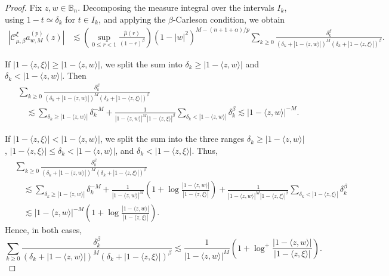\documentclass[preprint,12pt,times]{elsarticle}
\theoremstyle{definition}
\theoremstyle{remark}
\numberwithin{equation}{section}
\begin{document}
\begin{proof}
Fix \(z,w\in\mathbb B_n\). Decomposing the measure integral over the intervals
\(I_k\), using \(1-t\simeq\delta_k\) for \(t\in I_k\), and applying the
\(\beta\)-Carleson condition, we obtain
\[
\begin{aligned}
  |\mathcal C_{\mu,\beta}^{\xi}a_{w,M}^{(p)}(z)|
  &\lesssim
  \left(\sup_{0\le r<1}\frac{\widehat\mu(r)}{(1-r)^\beta}\right)
  (1-|w|^2)^{M-(n+1+\alpha)/p}
  \sum_{k\ge0}
  \frac{\delta_k^\beta}{(\delta_k+|1-\langle z,w\rangle|)^M
        (\delta_k+|1-\langle z,\xi\rangle|)^\beta}.
\end{aligned}
\]

\noindent If \(|1-\langle z,\xi\rangle|\ge |1-\langle z,w\rangle|\), we split the sum into
\(\delta_k\ge |1-\langle z,w\rangle|\) and \(\delta_k<|1-\langle z,w\rangle|\). Then
\[
\begin{aligned}
  &\sum_{k\ge0}
  \frac{\delta_k^\beta}{(\delta_k+|1-\langle z,w\rangle|)^M
        (\delta_k+|1-\langle z,\xi\rangle|)^\beta} \\
  &\quad\lesssim
  \sum_{\delta_k\ge |1-\langle z,w\rangle|}\delta_k^{-M}
  +\frac{1}{|1-\langle z,w\rangle|^M|1-\langle z,\xi\rangle|^\beta}
  \sum_{\delta_k<|1-\langle z,w\rangle|}\delta_k^\beta
  \lesssim |1-\langle z,w\rangle|^{-M}.
\end{aligned}
\]

\noindent If \(|1-\langle z,\xi\rangle|<|1-\langle z,w\rangle|\), we split the sum into the three ranges
\(\delta_k\ge |1-\langle z,w\rangle|\),
\(|1-\langle z,\xi\rangle|\le\delta_k<|1-\langle z,w\rangle|\), and
\(\delta_k<|1-\langle z,\xi\rangle|\). Thus,
\[
\begin{aligned}
  &\sum_{k\ge0}
  \frac{\delta_k^\beta}{(\delta_k+|1-\langle z,w\rangle|)^M
        (\delta_k+|1-\langle z,\xi\rangle|)^\beta} \\
  &\quad\lesssim
  \sum_{\delta_k\ge |1-\langle z,w\rangle|}\delta_k^{-M}
  +\frac{1}{|1-\langle z,w\rangle|^M}
   \left(1+\log\frac{|1-\langle z,w\rangle|}{|1-\langle z,\xi\rangle|}\right)
  +\frac{1}{|1-\langle z,w\rangle|^M|1-\langle z,\xi\rangle|^\beta}
   \sum_{\delta_k<|1-\langle z,\xi\rangle|}\delta_k^\beta \\
  &\quad\lesssim
  |1-\langle z,w\rangle|^{-M}
  \left(1+\log\frac{|1-\langle z,w\rangle|}{|1-\langle z,\xi\rangle|}\right).
\end{aligned}
\]
Hence, in both cases,
\[
  \sum_{k\ge0}
  \frac{\delta_k^\beta}{(\delta_k+|1-\langle z,w\rangle|)^M
        (\delta_k+|1-\langle z,\xi\rangle|)^\beta}
  \lesssim
  \frac{1}{|1-\langle z,w\rangle|^M}
  \left(1+\log^+
  \frac{|1-\langle z,w\rangle|}{|1-\langle z,\xi\rangle|}\right).
\]


\end{proof}
\end{document}
